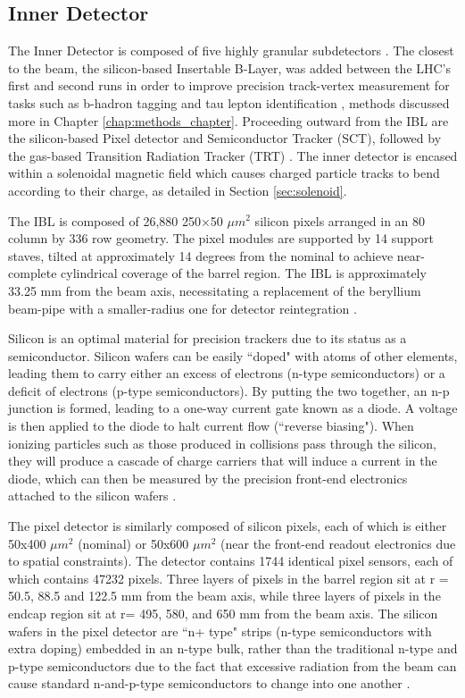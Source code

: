 \subsection{Inner Detector} \label{sec:ID} 

The Inner Detector is composed of five highly granular subdetectors \cite{ID}. The closest to the beam, the silicon-based Insertable B-Layer, was added between the LHC's first and second runs in order to improve precision track-vertex measurement for tasks such as b-hadron tagging and tau lepton identification \cite{IBL_TDR}, methods discussed more in Chapter \ref{chap:methods_chapter}. Proceeding outward from the IBL are the silicon-based Pixel detector and Semiconductor Tracker (SCT), followed by the gas-based Transition Radiation Tracker (TRT) \cite{ATLAS_TDR}. The inner detector is encased within a solenoidal magnetic field which causes charged particle tracks to bend according to their charge, as detailed in Section \ref{sec:solenoid}.

The IBL is composed of 26,880 250×50 $ \mu m^2 $ silicon pixels arranged in an 80 column by 336 row geometry. The pixel modules are supported by 14 support staves, tilted at approximately 14 degrees from the nominal to achieve near-complete cylindrical coverage of the barrel region. The IBL is approximately 33.25 mm from the beam axis, necessitating a replacement of the beryllium beam-pipe with a smaller-radius one for detector reintegration \cite{IBL_TDR}.

Silicon is an optimal material for precision trackers due to its status as a semiconductor. Silicon wafers can be easily ``doped" with atoms of other elements, leading them to carry either an excess of electrons (n-type semiconductors) or a deficit of electrons (p-type semiconductors). By putting the two together, an n-p junction is formed, leading to a one-way current gate known as a diode. A voltage is then applied to the diode to halt current flow (``reverse biasing"). When ionizing particles such as those produced in collisions pass through the silicon, they will produce a cascade of charge carriers that will induce a current in the diode, which can then be measured by the precision front-end electronics attached to the silicon wafers \cite{Knoll}.

The pixel detector is similarly composed of silicon pixels, each of which is either 50x400 $ \mu m^2 $ (nominal) or 50x600 $ \mu m^2 $ (near the front-end readout electronics due to spatial constraints). The detector contains 1744 identical pixel sensors, each of which contains 47232 pixels. Three layers of pixels in the barrel region sit at r = 50.5,  88.5 and 122.5 mm from the beam axis, while three layers of pixels in the endcap region sit at r= 495, 580, and 650 mm from the beam axis. The silicon wafers in the pixel detector are ``n+ type" strips (n-type semiconductors with extra doping) embedded in an n-type bulk, rather than the traditional n-type and p-type semiconductors due to the fact that excessive radiation from the beam can cause standard n-and-p-type semiconductors to change into one another \cite{Pixel}. 

